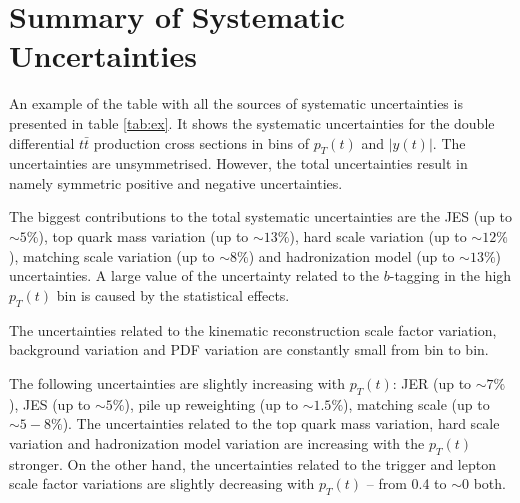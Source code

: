 % 
% 
% 
% 

\section{Summary of Systematic Uncertainties}

An example of the table with all the sources of systematic uncertainties is presented in table \ref{tab:ex}. It shows the 
systematic uncertainties for the double differential $t\bar{t}$ production cross sections in bins of $p_{T}(t)$ and $|y(t)|$.
The uncertainties are unsymmetrised. However, the total uncertainties result in namely symmetric positive and negative uncertainties.

The biggest contributions to the total systematic uncertainties are the JES (up to $\sim 5\%$), top quark mass variation (up to
$\sim 13\%$), hard scale variation (up to $\sim 12\%$), matching scale variation (up to $\sim 8\%$) and hadronization model
(up to $\sim 13\%$) uncertainties. A large value of the uncertainty related to the $b$-tagging in the high $p_{T}(t)$ bin 
is caused by the statistical effects.

The uncertainties related to the kinematic reconstruction scale factor variation, background variation and PDF variation are 
constantly small from bin to bin.

The following uncertainties are slightly increasing with $p_{T}(t)$: JER (up to $\sim 7\%$), JES (up to $\sim 5\%$), pile up
reweighting (up to $\sim 1.5\%$), matching scale (up to $\sim 5-8\%$). The uncertainties related to the top quark mass variation,
hard scale variation and hadronization model variation are increasing with the $p_{T}(t)$ stronger. On the other hand, the uncertainties
related to the trigger and lepton scale factor variations are slightly decreasing with $p_{T}(t)$ -- from 0.4 to $\sim0$ both.


